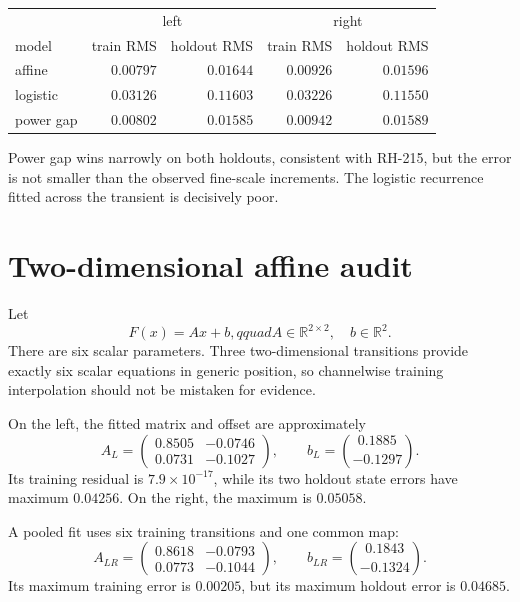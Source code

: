 \documentclass[12pt]{article}
\theoremstyle{remark}\newtheorem{remark}[theorem]{Remark}
\begin{document}
\begin{center}
\begin{tabular}{lrrrr}
\toprule
&\multicolumn{2}{c}{left}&\multicolumn{2}{c}{right}\\
model & train RMS & holdout RMS & train RMS & holdout RMS\\
\midrule
affine & $0.00797$ & $0.01644$ & $0.00926$ & $0.01596$\\
logistic & $0.03126$ & $0.11603$ & $0.03226$ & $0.11550$\\
power gap & $0.00802$ & $0.01585$ & $0.00942$ & $0.01589$\\
\bottomrule
\end{tabular}
\end{center}

Power gap wins narrowly on both holdouts, consistent with RH-215, but the
error is not smaller than the observed fine-scale increments.  The logistic
recurrence fitted across the transient is decisively poor.

\section{Two-dimensional affine audit}

Let
\begin{equation}\label{eq:affinemap}
 F(x)=Ax+b,qquad A\in\mathbb R^{2\times2},\quad b\in\mathbb R^2.
\end{equation}
There are six scalar parameters.  Three two-dimensional transitions provide
exactly six scalar equations in generic position, so channelwise training
interpolation should not be mistaken for evidence.

On the left, the fitted matrix and offset are approximately
\begin{equation}
 A_L=\begin{pmatrix}0.8505&-0.0746\\0.0731&-0.1027\end{pmatrix},
 \qquad b_L=\binom{0.1885}{-0.1297}.
\end{equation}
Its training residual is $7.9\times10^{-17}$, while its two holdout state
errors have maximum $0.04256$.  On the right, the maximum is $0.05058$.

A pooled fit uses six training transitions and one common map:
\begin{equation}
 A_{LR}=\begin{pmatrix}0.8618&-0.0793\\0.0773&-0.1044\end{pmatrix},
 \qquad b_{LR}=\binom{0.1843}{-0.1324}.
\end{equation}
Its maximum training error is $0.00205$, but its maximum holdout error is
$0.04685$.
\end{document}
